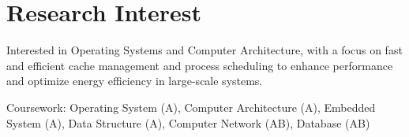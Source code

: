 \section{Research Interest}
\begin{onecolentry}
    Interested in Operating Systems and Computer Architecture,
    with a focus on fast and efficient cache management and process scheduling
    to enhance performance and optimize energy efficiency in large-scale systems.
    \begin{highlights}
        \item Coursework:
            Operating System (A),
            Computer Architecture (A),
            Embedded System (A),
            Data Structure (A),
            Computer Network (AB),
            Database (AB)
    \end{highlights}
\end{onecolentry}
